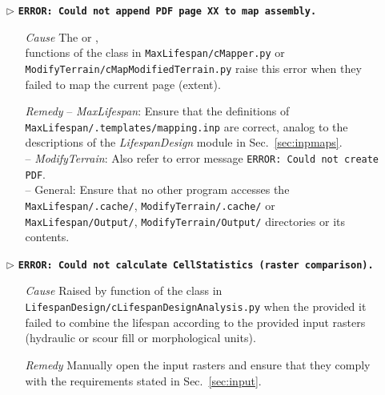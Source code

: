 \begin{itemize}
	\item[$\triangleright$]\textbf{\texttt{ERROR: Could not append PDF page XX to map assembly.}}
	\begin{itemize}
		\item[\textit{Cause}\hspace{0.27cm}] The  or , \\
	 functions of the  class in \texttt{MaxLifespan/cMapper.py} or\\ \texttt{ModifyTerrain/cMapModifiedTerrain.py} raise this error when they failed to map the current page (extent).
		\item[\textit{Remedy}] -- \textit{MaxLifespan}: Ensure that the definitions of \texttt{MaxLifespan/.templates/mapping.inp} are correct, analog to the descriptions of the \textit{LifespanDesign} module in Sec.~\ref{sec:inpmaps}.\\
								 -- \textit{ModifyTerrain}: Also refer to error message \texttt{ERROR: Could not create PDF}.\\
								 -- General: Ensure that no other program accesses the \texttt{MaxLifespan/.cache/}, \texttt{ModifyTerrain/.cache/} or \texttt{MaxLifespan/Output/}, \texttt{ModifyTerrain/Output/} directories or its contents.\\
	\end{itemize}
	
	\item[$\triangleright$]\textbf{\texttt{ERROR: Could not calculate CellStatistics (raster comparison).}}
	\begin{itemize}
		\item[\textit{Cause}\hspace{0.27cm}] Raised by  function of the  class in \texttt{LifespanDesign/cLifespanDesignAnalysis.py} when the provided it failed to combine the lifespan according to the provided input rasters (hydraulic or scour fill or morphological units).
		\item[\textit{Remedy}] Manually open the input rasters and ensure that they comply with the requirements stated in Sec.~\ref{sec:input}.\\
	\end{itemize}
	

\end{itemize}
